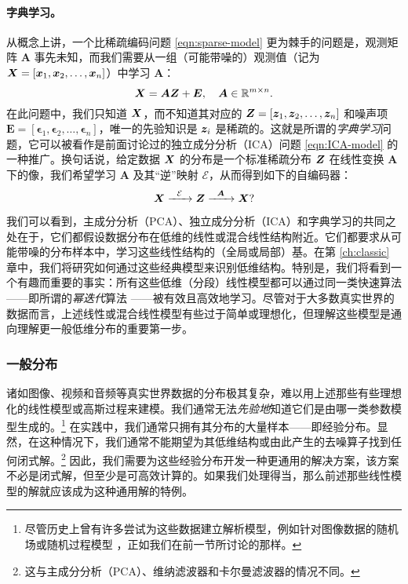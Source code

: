 \documentclass[../../book-main_zh.tex]{subfiles}
\begin{document}
\paragraph{字典学习。}
从概念上讲，一个比稀疏编码问题 \eqref{eqn:sparse-model} 更为棘手的问题是，观测矩阵 $\boldsymbol{A}$ 事先未知，而我们需要从一组（可能带噪的）观测值（记为 $\bm{X} = [\bm{x}_1, \bm{x}_2, \ldots, \bm{x}_n]$）中学习 $\boldsymbol{A}$：
\begin{equation}
    \bm{X} = \boldsymbol{A} \bm{Z} + \boldsymbol{E}, \quad \boldsymbol{A} \in \mathbb{R}^{m\times n}.
    \label{eqn:dictionary-learning}
\end{equation}
在此问题中，我们只知道 $\bm{X}$，而不知道其对应的 $\bm{Z} = [\bm{z}_1, \bm{z}_2, \ldots, \bm{z}_n]$ 和噪声项 $\boldsymbol{E}= [\boldsymbol{\epsilon}_1, \boldsymbol{\epsilon}_2, \ldots, \boldsymbol{\epsilon}_n]$，唯一的先验知识是 $\bm{z}_i$ 是稀疏的。这就是所谓的{\em 字典学习}问题，它可以被看作是前面讨论过的独立成分分析（ICA）问题 \eqref{eqn:ICA-model} 的一种推广。换句话说，给定数据 $\bm{X}$ 的分布是一个标准稀疏分布 $\bm{Z}$ 在线性变换 $\boldsymbol{A}$ 下的像，我们希望学习 $\boldsymbol{A}$ 及其“逆”映射 $\mathcal{E}$，从而得到如下的自编码器：
\begin{equation}
    \bm{X}   \xrightarrow{\hspace{2mm} \mathcal{E} \hspace{2mm}}  \bm{Z} \xrightarrow{\hspace{2mm} \boldsymbol{A} \hspace{2mm}} \bm{X}?
       \label{eqn:decoding-DL}
\end{equation}

我们可以看到，主成分分析（PCA）、独立成分分析（ICA）和字典学习的共同之处在于，它们都假设数据分布在低维的线性或混合线性结构附近。它们都要求从可能带噪的分布样本中，学习这些线性结构的（全局或局部）基。在第 \ref{ch:classic} 章中，我们将研究如何通过这些经典模型来识别低维结构。特别是，我们将看到一个有趣而重要的事实：所有这些低维（分段）线性模型都可以通过同一类快速算法——即所谓的{\em 幂迭代}算法 \cite{Zhai-2020}——被有效且高效地学习。尽管对于大多数真实世界的数据而言，上述线性或混合线性模型有些过于简单或理想化，但理解这些模型是通向理解更一般低维分布的重要第一步。

\subsubsection{一般分布}\label{sec:denoising-intro}

诸如图像、视频和音频等真实世界数据的分布极其复杂，难以用上述那些有些理想化的线性模型或高斯过程来建模。我们通常无法{\em 先验地}知道它们是由哪一类参数模型生成的。\footnote{尽管历史上曾有许多尝试为这些数据建立解析模型，例如针对图像数据的随机场或随机过程模型 \cite{Mumford-1999}，正如我们在前一节所讨论的那样。} 在实践中，我们通常只拥有其分布的大量样本——即经验分布。显然，在这种情况下，我们通常不能期望为其低维结构或由此产生的去噪算子找到任何闭式解。\footnote{这与主成分分析（PCA）、维纳滤波器和卡尔曼滤波器的情况不同。} 因此，我们需要为这些经验分布开发一种更通用的解决方案，该方案不必是闭式解，但至少是可高效计算的。如果我们处理得当，那么前述那些线性模型的解就应该成为这种通用解的特例。
\end{document}
